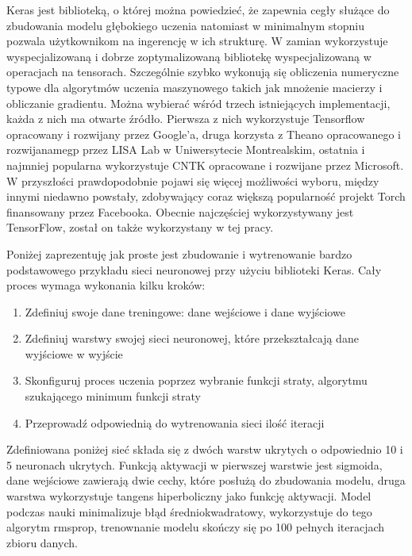 \documentclass[]{article}
\theoremstyle{definition}
\begin{document}
Keras jest biblioteką, o której można powiedzieć, że zapewnia cegły służące do zbudowania modelu głębokiego uczenia natomiast w minimalnym stopniu pozwala użytkownikom na ingerencję w ich strukturę. W zamian wykorzystuje wyspecjalizowaną i dobrze zoptymalizowaną bibliotekę wyspecjalizowaną w operacjach na tensorach. Szczególnie szybko wykonują się obliczenia numeryczne typowe dla algorytmów uczenia maszynowego takich jak mnożenie macierzy i obliczanie gradientu.  Można wybierać wśród trzech istniejących implementacji, każda z nich ma otwarte źródło. Pierwsza z nich wykorzystuje Tensorflow opracowany i rozwijany przez Google'a, druga korzysta z Theano opracowanego i rozwijanamegp przez LISA Lab w Uniwersytecie Montrealskim, ostatnia i najmniej popularna wykorzystuje CNTK opracowane i rozwijane przez Microsoft. W przyszłości prawdopodobnie pojawi się więcej możliwości wyboru, między innymi niedawno powstały, zdobywający coraz większą popularność projekt Torch finansowany przez Facebooka. Obecnie najczęściej wykorzystywany jest TensorFlow, został on także wykorzystany w tej pracy. 


Poniżej zaprezentuję jak proste jest zbudowanie i wytrenowanie bardzo podstawowego przykładu sieci neuronowej przy użyciu biblioteki Keras. Cały proces wymaga wykonania kilku kroków:
\begin{enumerate}
	\setlength\itemsep{0.em}
	\item Zdefiniuj swoje dane treningowe: dane wejściowe i dane wyjściowe
	\item Zdefiniuj warstwy swojej sieci neuronowej, które przekształcają dane wyjściowe w wyjście
	\item Skonfiguruj proces uczenia poprzez wybranie funkcji straty, algorytmu szukającego minimum funkcji straty
	\item Przeprowadź odpowiednią do wytrenowania sieci ilość iteracji
\end{enumerate}

Zdefiniowana poniżej sieć składa się z dwóch warstw ukrytych o odpowiednio 10 i 5 neuronach ukrytych. Funkcją aktywacji w pierwszej warstwie jest sigmoida, dane wejściowe zawierają dwie cechy, które posłużą do zbudowania modelu, druga warstwa wykorzystuje tangens hiperboliczny jako funkcję aktywacji. Model podczas nauki minimalizuje błąd średniokwadratowy, wykorzystuje do tego algorytm rmsprop, trenownanie modelu skończy się po 100 pełnych iteracjach zbioru danych.
\end{document}
